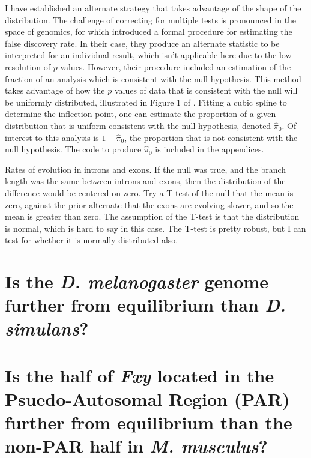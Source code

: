 I have established an alternate strategy that takes advantage of the shape of the distribution. The challenge of correcting for multiple tests is pronounced in the space of genomics, for which \cite{Storey2003StatisticalStudies} introduced a formal procedure for estimating the false discovery rate. In their case, they produce an alternate statistic to be interpreted for an individual result, which isn't applicable here due to the low resolution of $p$ values. However, their procedure included an estimation of the fraction of an analysis which is consistent with the null hypothesis. This method takes advantage of how the $p$ values of data that is consistent with the null will be uniformly distributed, illustrated in Figure 1 of \cite{Storey2003StatisticalStudies}. Fitting a cubic spline to determine the inflection point, one can estimate the proportion of a given distribution that is uniform consistent with the null hypothesis, denoted $\hat \pi_{0}$. Of interest to this analysis is $1 -\hat \pi_{0}$, the proportion that is not consistent with the null hypothesis. The code to produce $\hat \pi_{0}$ is included in the appendices. 

Rates of evolution in introns and exons. If the null was true, and the branch length was the same between introns and exons, then the distribution of the difference would be centered on zero. Try a T-test of the null that the mean is zero, against the prior alternate that the exons are evolving slower, and so the mean is greater than zero. The assumption of the T-test is that the distribution is normal, which is hard to say in this case. The T-test is pretty robust, but I can test for whether it is normally distributed also. 


\section{Is the \textit{D. melanogaster} genome further from equilibrium than \textit{D. simulans}?}
 
\section{Is the half of \textit{Fxy} located in the Psuedo-Autosomal Region (PAR) further from equilibrium than the non-PAR half in \textit{M. musculus}?}